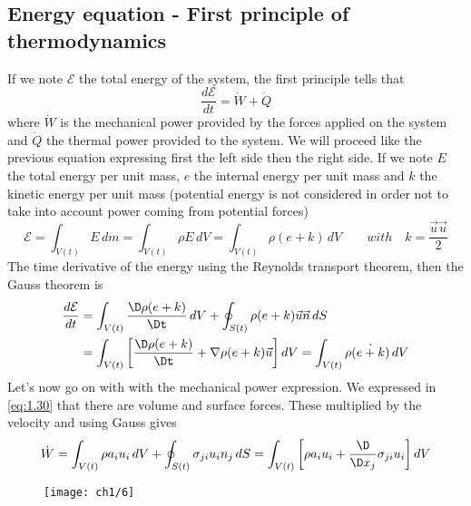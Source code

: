 	\subsection{Energy equation - First principle of thermodynamics}
		If we note $\mathcal{E}$ the total energy of the system, the first principle tells that
		\begin{equation}
			\frac{d\mathcal{E}}{dt} = \dot{W} + \dot{Q}
			\label{eq:1.38}
		\end{equation}
		where $\dot{W}$ is the mechanical power provided by the forces applied on the system and $\dot{Q}$ the thermal power provided to the system. We will proceed like the previous equation expressing first the left side then the right side. If we note $E$ the total energy per unit mass, $e$ the internal energy per unit mass and $k$ the kinetic energy per unit mass (potential energy is not considered in order not to take into account power coming from potential forces)
		\begin{equation}
			\mathcal{E} = \int _{V(t)} E\, dm = \int _{V(t)} \rho E \, dV = \int _{V(t)} \rho (e+k) \, dV \qquad with \quad k = \frac{\vec{u} \vec{u}}{2}
		\end{equation}
		The time derivative of the energy using the Reynolds transport theorem, then the Gauss theorem is 
		\begin{equation}
		\begin{aligned}
			\frac{d\mathcal{E}}{dt} &= \int _{V(t)} \frac{\D\rho (e+k)}{\Dt} \, dV + \oint _{S(t)} \rho (e+k)\vec{u} \vec{n} \, dS \\
			&= \int _{V(t)} \left[\frac{\D\rho (e+k)}{\Dt} + \nabla \rho (e+k)\vec{u}  \right] dV = \int _{V(t)} \rho \dot{(e+k)}\, dV 
		\end{aligned}
		\label{eq:1.40}
		\end{equation}
		Let's now go on with with the mechanical power expression. We expressed in \eqref{eq:1.30} that there are volume and surface forces. These multiplied by the velocity and using Gauss gives 
		\begin{equation}
			\dot{W} = \int _{V(t)} \rho a_i u_i \, dV + \oint _{S(t)} \sigma _{ji} u_i n_j \, dS = \int _{V(t)} \left[ \rho a_i u_i + \frac{\D}{\D x_j}\sigma _{ji} u_i\right] dV
			\label{eq:1.41}
		\end{equation}
		\begin{wrapfigure}[6]{l}{3cm}
		\vspace{-5mm}
		\texttt{[image: ch1/6]}
		\end{wrapfigure}
